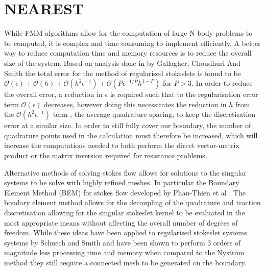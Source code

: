 \FloatBarrier
\section{NEAREST} \label{sec:NEAREST}
While FMM algorithms allow for the computation of large N-body problems to be computed, it is complex and time consuming to implement efficiently. A better way to reduce computation time and memory resources is to reduce the overall size of the system. Based on analysis done in by Gallagher, Choudhuri And Smith \cite{Gallagher2019SharpEquation} the total error for the method of regularised stokeslets is found to be $\mathcal{O}(\epsilon) + \mathcal{O}(h) + \mathcal{O}(h^2\epsilon^{-1}) + \mathcal{O}(P\epsilon^{-1/P} h^{1-P})$ for $P>3$. In order to reduce the overall error, a reduction in $\epsilon$ is required such that to the regularisation error term $\mathcal{O}(\epsilon)$ decreases, however doing this necessitates the reduction in $h$ from the $\mathcal{O}(h^2\epsilon^{-1})$ term , the average quadrature spacing, to keep the discretisation error at a similar size. In order to still fully cover our boundary, the number of quadrature points used in the calculation must therefore be increased, which will increase the computations needed to both perform the direct vector-matrix product or the matrix inversion required for resistance problems. 

Alternative methods of solving stokes flow allows for solutions to the singular systems to be solve with highly refined meshes. In particular the Boundary Element Method (BEM) for stokes flow developed by Phan-Thien et al \cite{Tran-Cong1987APropulsion}. The boudary element method allows for the decoupling of the quadrature and traction discretisation allowing for the singular stokeslet kernel to be evaluated in the most appropriate means without affecting the overall number of degrees of freedom. While these ideas have been applied to regularised stokeslet systems systems by Schuech and Smith \cite{Smith2009AFlow,SchuechMotilePareto-optimal} and have been shown to perform 3 orders of magnitude less processing time and memory when compared to the Nyström method they still require a connected mesh to be generated on the boundary. 

